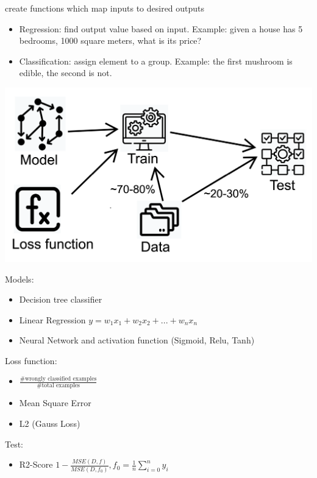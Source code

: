 create functions which map inputs to desired outputs
\begin{itemize}
    \item Regression: find output value based on input. Example: given a house has 5 bedrooms, 1000 square meters, what is its price?
    \item Classification: assign element to a group. Example: the first mushroom is edible, the second is not.
\end{itemize}

\includegraphics[width = \linewidth]{src/8_ml/images/ml_overview.png}

Models:
\begin{itemize}
    \item Decision tree classifier
    \item Linear Regression $y = w_1 x_1 + w_2 x_2 +...+ w_n x_n$
    \item Neural Network and activation function (Sigmoid, Relu, Tanh)
\end{itemize}

Loss function:
\begin{itemize}
    \item $\frac{\text{\# wrongly classified examples}}{\text{\# total examples}}$
    \item Mean Square Error
    \item L2 (Gauss Loss)
\end{itemize}

Test:
\begin{itemize}
    \item R2-Score $1 - \frac{MSE(D, f)}{MSE(D, f_0)}, f_0 = \frac{1}{n} \sum_{i = 0}^{n} y_i$
\end{itemize}